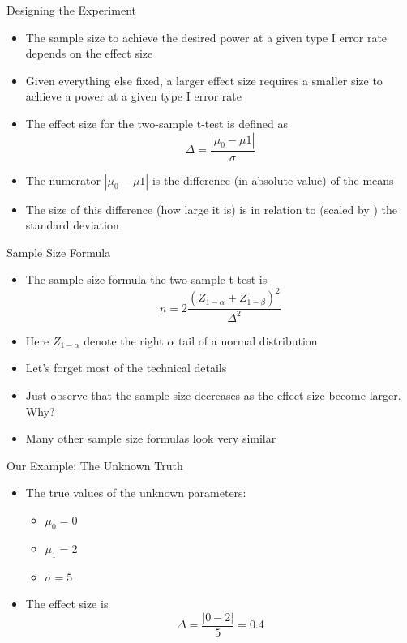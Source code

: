 \documentclass[xcolor=x11names,compress]{beamer}\usepackage[]{graphicx}\usepackage[]{color}
\begin{document}
\begin{frame}{Designing the Experiment}
  \begin{itemize}
  \item The sample size to achieve the desired power at a given type I error
        rate depends on the effect size
  \item Given everything else fixed, a larger effect size requires a smaller
        size to achieve a power at a given type I error rate
  \item The effect size for the two-sample t-test is defined as
    \begin{equation*}
      \Delta=\frac{| \mu_0-\mu1 |}{\sigma}
    \end{equation*}
  \item The numerator $| \mu_0-\mu1 |$ is the difference (in absolute
       value) of the means
  \item The size of this difference (how large it is) is in relation to (scaled by ) 
    the standard deviation
  \end{itemize}
\end{frame}


\begin{frame}{Sample Size Formula}
  \begin{itemize}
  \item The sample size formula the two-sample t-test is
    \begin{equation*}
      n=2\frac{(Z_{1-\alpha}+Z_{1-\beta})^2}{\Delta^2}
    \end{equation*}
  \item Here $Z_{1-\alpha}$ denote the right $\alpha$ tail of 
        a normal distribution
  \item Let's forget most of the technical details
  \item Just observe that the sample size decreases as the effect
        size become larger. Why?
  \item Many other sample size formulas look very similar
  \end{itemize}
\end{frame}

\begin{frame}{Our Example: The Unknown Truth}
  \begin{itemize}
  \item The true values of the unknown parameters:
    \begin{itemize}
    \item $\mu_0=0$ 
    \item $\mu_1=2$
    \item $\sigma=5$
    \end{itemize}
  \item The effect size is
    \begin{equation*}
      \Delta=\frac{|0-2|}{5}=0.4
    \end{equation*}
  \end{itemize}
\end{frame}
\end{document}
